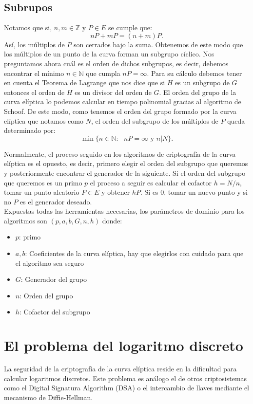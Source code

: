 \documentclass[11pt]{article}
\begin{document}
\subsection{Subrupos}
Notamos que si, $ n, m \in \mathbb{Z} $ y $ P \in E $ se cumple que:
\[
nP + mP = (n+m)P.
\]
Así, los múltiplos de $ P $ son cerrados bajo la suma. Obtenemos de este modo que los múltiplos de un punto de la curva forman un subgrupo cíclico. Nos preguntamos ahora cuál es el orden de dichos subgrupos, es decir, debemos encontrar el mínimo $ n \in \mathbb{N} $ que cumpla $ nP = \infty $. Para su cálculo debemos tener en cuenta el Teorema de Lagrange que nos dice que si $ H $ es un subgrupo de $ G $ entonces el orden de $ H $ es un divisor del orden de $ G $. El orden del grupo de la curva elíptica lo podemos calcular en tiempo polinomial gracias al algoritmo de Schoof. De este modo, como tenemos el orden del grupo formado por la curva elíptica que notamos como $ N $, el orden del subgrupo de los múltiplos de $ P $ queda determinado por:
\[
\min\{ n \in \mathbb{N}:\text{ } nP = \infty \text{ y } n | N\}.
\]

Normalmente, el proceso seguido en los algoritmos de criptografía de la curva elíptica es el opuesto, es decir, primero elegir el orden del subgrupo que queremos y posteriormente encontrar el generador de la siguiente. Si el orden del subgrupo que queremos es un primo $ p $ el proceso a seguir es calcular el cofactor $ h = N/n $, tomar un punto aleatorio $ P \in E $ y obtener $ hP $. Si es 0, tomar un nuevo punto y si no $ P $ es el generador deseado. \\

Expuestas todas las herramientas necesarias, los parámetros de dominio para los algoritmos son $ (p, a, b, G, n, h) $ donde:
\begin{itemize}
	\item $ p $: primo
	\item $ a, b $: Coeficientes de la curva elíptica, hay que elegirlos con cuidado para que el algoritmo sea seguro
	\item $ G $: Generador del grupo
	\item $ n $: Orden del grupo
	\item $ h $: Cofactor del subgrupo
\end{itemize}
\section{El problema del logaritmo discreto}
La seguridad de la criptografía de la curva elíptica reside en la dificultad para calcular logaritmos discretos. Este problema es análogo el de otros criptosistemas como el Digital Signatura Algorithm (DSA) o el intercambio de llaves mediante el mecanismo de Diffie-Hellman.
\end{document}
